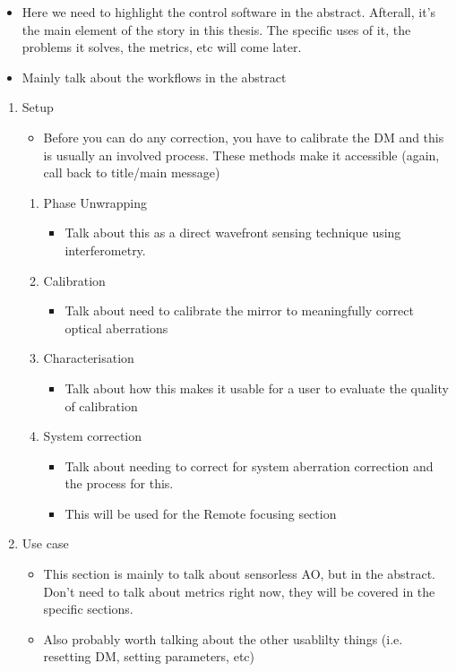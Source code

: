 \documentclass[twoside,onecolumn]{article}
\begin{document}
\begin{enumerate}[label*=\arabic*.]
\begin{enumerate}[label*=\arabic*.]
\begin{itemize}
			\item Here we need to highlight the control software in the abstract. Afterall, it's the main element of the story in this thesis. The specific uses of it, the problems it solves, the metrics, etc will come later.
			\item Mainly talk about the workflows in the abstract
		\end{itemize}
		\begin{enumerate}[label*=\arabic*.]
			\item Setup
			\begin{itemize}
				\item Before you can do any correction, you have to calibrate the DM and this is usually an involved process. These methods make it accessible (again, call back to title/main message)
			\end{itemize}
			\begin{enumerate}[label*=\arabic*.]
				\item Phase Unwrapping
				\begin{itemize}
					\item Talk about this as a direct wavefront sensing technique using interferometry.
				\end{itemize}
				\item Calibration
				\begin{itemize}
					\item Talk about need to calibrate the mirror to meaningfully correct optical aberrations
				\end{itemize}
				\item  Characterisation
				\begin{itemize}
					\item Talk about how this makes it usable for a user to evaluate the quality of calibration
				\end{itemize}
				\item System correction
				\begin{itemize}
					\item Talk about needing to correct for system aberration correction and the process for this.
					\item This will be used for the Remote focusing section
				\end{itemize}
			\end{enumerate}
		\item Use case
		\begin{itemize}
			\item This section is mainly to talk about sensorless AO, but in the abstract. Don't need to talk about metrics right now, they will be covered in the specific sections.
			\item Also probably worth talking about the other usablilty things (i.e. resetting DM, setting parameters, etc)
		\end{itemize}
		\end{enumerate}
	\end{enumerate}


\end{enumerate}
\end{document}

